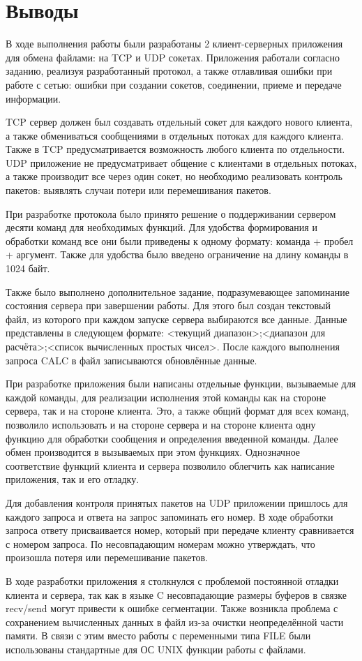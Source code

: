 \section{Выводы}
В ходе выполнения работы были разработаны 2 клиент-серверных приложения для обмена файлами: на TCP и UDP сокетах. Приложения работали согласно заданию, реализуя разработанный протокол, а также отлавливая ошибки при работе с сетью: ошибки при создании сокетов, соединении, приеме и передаче информации. 
 
TCP сервер должен был создавать отдельный сокет для каждого нового клиента, а также обмениваться сообщениями в отдельных потоках для каждого клиента. Также в TCP предусматривается возможность любого клиента по отдельности. UDP приложение не предусматривает общение с клиентами  в отдельных потоках, а также производит все через один сокет, но необходимо реализовать контроль пакетов: выявлять случаи потери или перемешивания пакетов.

При разработке протокола было принято решение о поддерживании сервером десяти команд для необходимых функций. Для удобства формирования и обработки команд все они были приведены к одному формату: команда + пробел + аргумент. Также для удобства было введено ограничение на длину команды в 1024 байт.

Также было выполнено дополнительное задание, подразумевающее запоминание состояния сервера при завершении работы. Для этого был создан текстовый файл, из которого при каждом запуске сервера выбираются все данные. Данные представлены в следующем формате: <текущий диапазон>;<диапазон для расчёта>;<список вычисленных простых чисел>. После каждого выполнения запроса CALC в файл записываются обновлённые данные.

При разработке приложения были написаны отдельные функции, вызываемые для каждой команды, для реализации исполнения этой команды как на стороне сервера, так и на стороне клиента. Это, а также общий формат для всех команд, позволило использовать и на стороне сервера и на стороне клиента одну функцию для обработки сообщения и определения введенной команды. Далее обмен производится в вызываемых при этом функциях. Однозначное соответствие функций клиента и сервера позволило облегчить как написание приложения, так и его отладку.

Для добавления контроля принятых пакетов на UDP приложении пришлось для каждого запроса и ответа на запрос запоминать его номер. В ходе обработки запроса ответу присваивается номер, который при передаче клиенту сравнивается с номером запроса. По несовпадающим номерам можно утверждать, что произошла потеря или перемешивание пакетов.

В ходе разработки приложения я столкнулся с проблемой постоянной отладки клиента и сервера, так как в языке C несовпадающие размеры буферов в связке recv/send могут привести к ошибке сегментации. Также возникла проблема с сохранением вычисленных данных в файл из-за очистки неопределённой части памяти. В связи с этим вместо работы с переменными типа FILE были использованы стандартные для ОС UNIX функции работы с файлами.

